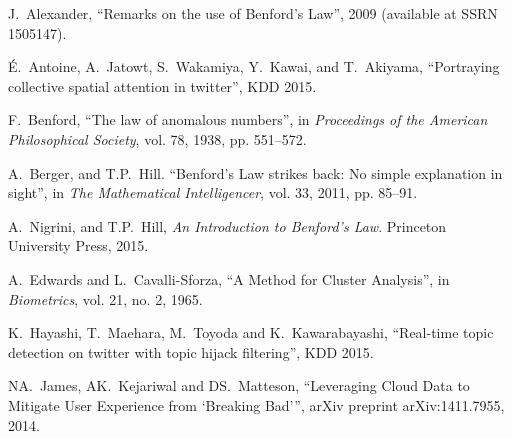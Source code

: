 \documentclass[twoside,leqno,twocolumn]{article}\usepackage[]{graphicx}\usepackage[]{color}
\begin{document}
\begin{thebibliography}{99}

  J.~Alexander, ``Remarks on the use of Benford’s Law'', 2009 (available at SSRN 1505147).

  {\'E}.~Antoine, A.~Jatowt, S.~Wakamiya, Y.~Kawai, and T.~Akiyama, ``Portraying collective spatial attention in twitter'', KDD 2015.

  
  
  
  F.~Benford, ``The law of anomalous numbers'', in \emph{Proceedings of the American Philosophical Society}, vol. 78, 1938, pp. 551--572.

  A.~Berger, and T.P.~Hill. ``Benford’s Law strikes back: No simple explanation in sight'', in \emph{The Mathematical Intelligencer}, vol. 33, 2011, pp. 85--91.
  
  A.~Nigrini, and T.P.~Hill, \emph{An Introduction to Benford's Law}. Princeton University Press, 2015.

  A.~Edwards and L.~Cavalli-Sforza, ``A Method for Cluster Analysis'', in \emph{Biometrics}, vol. 21, no. 2, 1965.
  

  K.~Hayashi, T.~Maehara, M.~Toyoda and K.~Kawarabayashi, ``Real-time topic detection on twitter with topic hijack filtering'', KDD 2015.

  NA.~James, AK.~Kejariwal and DS.~Matteson, ``Leveraging Cloud Data to Mitigate User Experience
  from ‘Breaking Bad’'', arXiv preprint arXiv:1411.7955, 2014.
  
  

\end{thebibliography}
\end{document}
